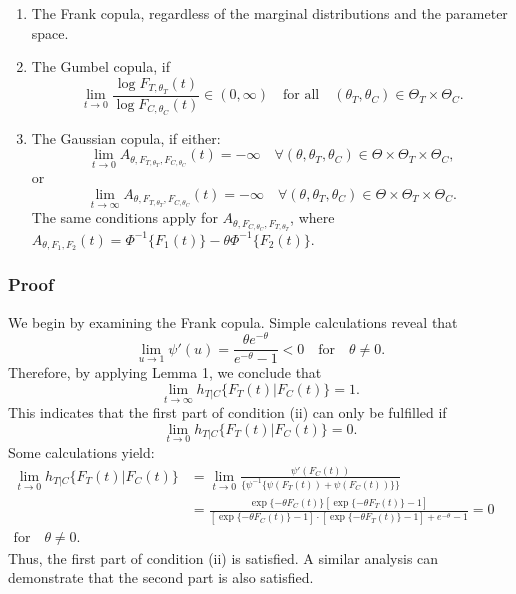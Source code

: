 \begin{enumerate}
    \item The Frank copula, regardless of the marginal distributions and the parameter space.
    \item The Gumbel copula, if 
    \[
    \lim_{t \to 0} \frac{\log F_{T, \theta_T}(t)}{\log F_{C, \theta_C}(t)} \in (0, \infty) \quad \text{for all} \quad (\theta_T, \theta_C) \in \Theta_T \times \Theta_C.
    \]
    \item The Gaussian copula, if either:
    \[
        \lim_{t \to 0} A_{\theta, F_{T, \theta_T}, F_{C, \theta_C}}(t) = -\infty \quad \forall (\theta, \theta_T, \theta_C) \in \Theta \times \Theta_T \times \Theta_C,
        \]
        or 
        \[
        \lim_{t \to \infty} A_{\theta, F_{T, \theta_T}, F_{C, \theta_C}}(t) = -\infty \quad \forall (\theta, \theta_T, \theta_C) \in \Theta \times \Theta_T \times \Theta_C.
        \]
    The same conditions apply for \( A_{\theta, F_{C, \theta_C}, F_{T, \theta_T}} \), where \\ \( A_{\theta, F_1, F_2}(t) = \Phi^{-1} \{F_1(t)\} - \theta \Phi^{-1} \{F_2(t)\}. \)
\end{enumerate}

\subsubsection*{Proof} 
We begin by examining the Frank copula. Simple calculations reveal that
\[
\lim_{u \to 1} \psi'(u) = \frac{\theta e^{-\theta}}{e^{-\theta} - 1} < 0 \quad \text{for} \quad \theta \neq 0.
\]
Therefore, by applying Lemma 1, we conclude that 
\[
\lim_{t \to \infty} h_{T|C}\{F_T(t) | F_C(t)\} = 1.
\]
This indicates that the first part of condition (ii) can only be fulfilled if 
\[
\lim_{t \to 0} h_{T|C}\{F_T(t) | F_C(t)\} = 0.
\]
Some calculations yield:
\begin{align*}
\lim_{t \to 0} h_{T|C}\{F_T(t) | F_C(t)\} &= \lim_{t \to 0} \frac{\psi'(F_C(t))}{ \{\psi^{-1}\{\psi(F_T(t)) + \psi(F_C(t))\}\}}\\
 &= \frac{\exp\{-\theta F_C(t)\} \left[ \exp\{-\theta F_T(t)\} - 1\right]}{[\exp\{-\theta F_C(t)\} - 1 ]\cdot \left[\exp\{-\theta F_T(t)\} - 1 \right] + e^{-\theta} - 1} = 0 \quad \\
 \text{for} \quad \theta \neq 0.
\end{align*}
Thus, the first part of condition (ii) is satisfied. A similar analysis can demonstrate that the second part is also satisfied.

